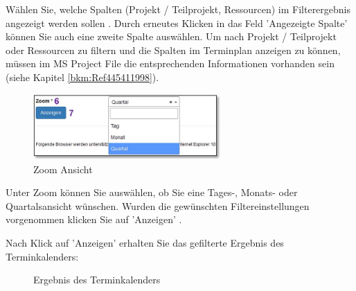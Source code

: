 Wählen Sie, welche Spalten (Projekt / Teilprojekt, Ressourcen) im Filterergebnis angezeigt werden sollen . Durch erneutes Klicken in das Feld 'Angezeigte Spalte' können Sie auch eine zweite Spalte auswählen. Um nach Projekt / Teilprojekt oder Ressourcen zu filtern und die Spalten im Terminplan anzeigen zu können, müssen im MS Project File die entsprechenden Informationen vorhanden sein (siehe Kapitel \ref{bkm:Ref445411998}).


\vspace{\baselineskip}

\begin{figure}
  \vspace{-30pt}
  \begin{center}
    \includegraphics[height=25mm]{../chapters/04_Terminplanung/pictures/4-3_Zoom-Ansicht.jpg}
  \end{center}
  \vspace{-20pt}
  \caption{Zoom Ansicht}
  \vspace{-10pt}
\end{figure}
Unter Zoom  können Sie auswählen, ob Sie eine Tages-, Monats- oder Quartalsansicht wünschen. Wurden die gewünschten Filtereinstellungen vorgenommen klicken Sie auf 'Anzeigen' .

\vspace{\baselineskip}
\vspace{\baselineskip}

Nach Klick auf 'Anzeigen' erhalten Sie das gefilterte Ergebnis des Terminkalenders:

\begin{figure}[H]
\caption{Ergebnis des Terminkalenders}
\end{figure}

